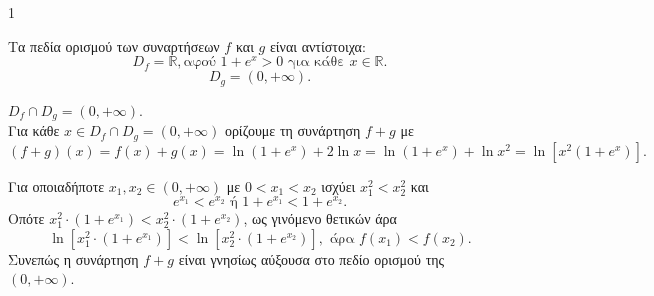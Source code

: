 \begin{ylh}{1}
    \item [Ύλη από εικόνα]
\end{ylh}

\begin{alist}
\item Τα πεδία ορισμού των συναρτήσεων $f$ και $g$ είναι αντίστοιχα:
    \[ D_f = \mathbb{R}, \text{αφού } 1+e^x > 0 \text{ για κάθε } x \in \mathbb{R}. \]
    \[ D_g = (0, +\infty). \]
\item $D_f \cap D_g = (0, +\infty).$ \\
    Για κάθε $x \in D_f \cap D_g = (0, +\infty)$ ορίζουμε τη συνάρτηση $f+g$ με
    \[ (f+g)(x) = f(x) + g(x) = \ln(1+e^x) + 2\ln x = \ln(1+e^x) + \ln x^2 = \ln[x^2 (1+e^x)]. \]
\item Για οποιαδήποτε $x_1, x_2 \in (0, +\infty)$ με $0 < x_1 < x_2$ ισχύει $x_1^2 < x_2^2$ και
    \[ e^{x_1} < e^{x_2} \text{ ή } 1+e^{x_1} < 1+e^{x_2}. \]
    Οπότε $x_1^2 \cdot (1+e^{x_1}) < x_2^2 \cdot (1+e^{x_2})$, ως γινόμενο θετικών άρα
    \[ \ln [x_1^2 \cdot (1+e^{x_1})] < \ln [x_2^2 \cdot (1+e^{x_2})], \text{ άρα } f(x_1) < f(x_2). \]
    Συνεπώς η συνάρτηση $f+g$ είναι γνησίως αύξουσα στο πεδίο ορισμού της $(0, +\infty).$
\end{alist}